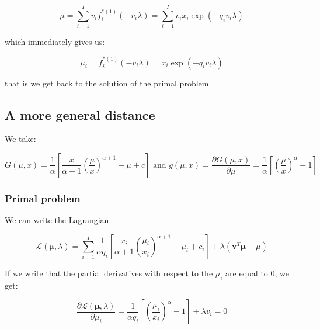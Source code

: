 \documentclass{tex/note}
\begin{document}
\begin{equation*}
\mu = \sum_{i = 1}^I v_i f_i^{* \left( 1 \right)} \left( - v_i \lambda \right) = \sum_{i = 1}^I v_i x_i \exp \left( - q_i v_i \lambda \right)
\end{equation*}

which immediately gives us:

\begin{equation*}
\mu_i = f_i^{* \left( 1 \right)} \left( - v_i \lambda \right) = x_i \exp \left( - q_i v_i \lambda \right)
\end{equation*}

that is we get back to the solution of the primal problem.

\subsection{A more general distance}

We take:

\begin{equation*}
G \left( \mu , x \right) = \frac{1}{\alpha} \left[ \frac{x}{\alpha + 1} \left( \frac{\mu}{x} \right) ^{\alpha + 1} - \mu + c \right] \text{ and } g \left( \mu , x \right) = \frac{\partial G \left( \mu , x \right)}{\partial \mu} = \frac{1}{\alpha} \left[ \left( \frac{\mu}{x} \right) ^{\alpha} - 1\right]
\end{equation*}

\subsubsection{Primal problem}

We can write the Lagrangian:

\begin{equation*}
\mathcal{L} \left( \bm{\mu} , \lambda \right) = \sum_{i = 1}^I \frac{1}{\alpha q_i} \left[ \frac{x_i}{\alpha + 1} \left( \frac{\mu_i}{x_i} \right) ^{\alpha + 1} - \mu_i + c_i \right] + \lambda \left( \bm{v}^T \bm{\mu} - \mu \right)
\end{equation*}

If we write that the partial derivatives with respect to the $\mu_i$ are equal to $0$, we get:

\begin{equation*}
\frac{\partial \mathcal{L} \left( \bm{\mu} , \lambda \right)}{\partial \mu_i} = \frac{1}{\alpha q_i} \left[ \left( \frac{\mu_i}{x_i} \right) ^{\alpha} - 1\right] + \lambda v_i = 0
\end{equation*}
\end{document}
